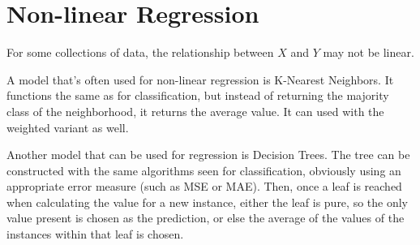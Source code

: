 \section{Non-linear Regression}

For some collections of data, the relationship between $X$ and $Y$ may not be linear.

A model that's often used for non-linear regression is K-Nearest Neighbors. It functions the same as for classification, but instead of returning the majority class of the neighborhood, it returns the average value. It can used with the weighted variant as well.

Another model that can be used for regression is Decision Trees. The tree can be constructed with the same algorithms seen for classification, obviously using an appropriate error measure (such as MSE or MAE). Then, once a leaf is reached when calculating the value for a new instance, either the leaf is pure, so the only value present is chosen as the prediction, or else the average of the values of the instances within that leaf is chosen. 